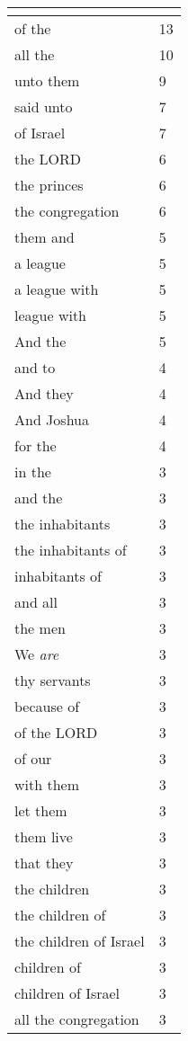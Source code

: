 \begin{center}
\begin{longtable}{|p{3.0in}|p{0.5in}|}
\hline \multicolumn{2}{c}{{ }} \\ \hline
\endfoot 
of the & 13\\ \hline 
all the & 10\\ \hline 
unto them & 9\\ \hline 
said unto & 7\\ \hline 
of Israel & 7\\ \hline 
the LORD & 6\\ \hline 
the princes & 6\\ \hline 
the congregation & 6\\ \hline 
them and & 5\\ \hline 
a league & 5\\ \hline 
a league with & 5\\ \hline 
league with & 5\\ \hline 
And the & 5\\ \hline 
and to & 4\\ \hline 
And they & 4\\ \hline 
And Joshua & 4\\ \hline 
for the & 4\\ \hline 
in the & 3\\ \hline 
and the & 3\\ \hline 
the inhabitants & 3\\ \hline 
the inhabitants of & 3\\ \hline 
inhabitants of & 3\\ \hline 
and all & 3\\ \hline 
the men & 3\\ \hline 
We \emph{are} & 3\\ \hline 
thy servants & 3\\ \hline 
because of & 3\\ \hline 
of the LORD & 3\\ \hline 
of our & 3\\ \hline 
with them & 3\\ \hline 
let them & 3\\ \hline 
them live & 3\\ \hline 
that they & 3\\ \hline 
the children & 3\\ \hline 
the children of & 3\\ \hline 
the children of Israel & 3\\ \hline 
children of & 3\\ \hline 
children of Israel & 3\\ \hline 
all the congregation & 3\\ \hline 

\end{longtable}
\end{center}
